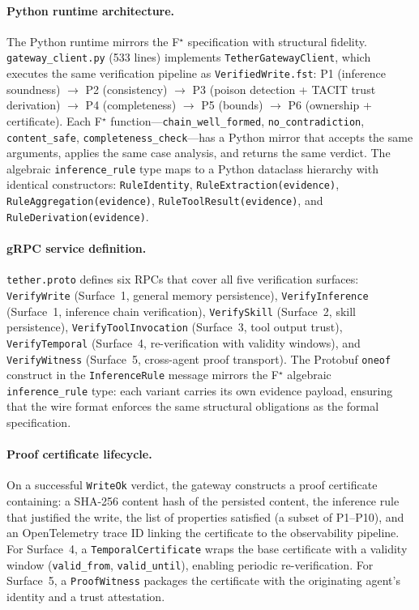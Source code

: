 \documentclass[sigplan,screen,nonacm]{acmart}
\newcommand{\fstar}{F\ensuremath{^\star}}
\begin{document}
\paragraph{Python runtime architecture.}
The Python runtime mirrors the \fstar{} specification with structural
fidelity. \texttt{gateway\_client.py} (533 lines) implements
\texttt{TetherGatewayClient}, which executes the same verification pipeline
as \texttt{VerifiedWrite.fst}: P1 (inference soundness) $\to$ P2
(consistency) $\to$ P3 (poison detection + TACIT trust derivation) $\to$
P4 (completeness) $\to$ P5 (bounds) $\to$ P6 (ownership + certificate).
Each \fstar{} function---\texttt{chain\_well\_formed},
\texttt{no\_contradiction}, \texttt{content\_safe},
\texttt{completeness\_check}---has a Python mirror that accepts the same
arguments, applies the same case analysis, and returns the same verdict. The
algebraic \texttt{inference\_rule} type maps to a Python dataclass hierarchy
with identical constructors: \texttt{RuleIdentity},
\texttt{RuleExtraction(evidence)}, \texttt{RuleAggregation(evidence)},
\texttt{RuleToolResult(evidence)}, and \texttt{RuleDerivation(evidence)}.

\paragraph{gRPC service definition.}
\texttt{tether.proto} defines six RPCs that cover all five verification
surfaces: \texttt{VerifyWrite} (Surface~1, general memory persistence),
\texttt{VerifyInference} (Surface~1, inference chain verification),
\texttt{VerifySkill} (Surface~2, skill persistence),
\texttt{VerifyToolInvocation} (Surface~3, tool output trust),
\texttt{VerifyTemporal} (Surface~4, re-verification with validity windows),
and \texttt{VerifyWitness} (Surface~5, cross-agent proof transport). The
Protobuf \texttt{oneof} construct in the \texttt{InferenceRule} message
mirrors the \fstar{} algebraic \texttt{inference\_rule} type: each variant
carries its own evidence payload, ensuring that the wire format enforces the
same structural obligations as the formal specification.

\paragraph{Proof certificate lifecycle.}
On a successful \texttt{WriteOk} verdict, the gateway constructs a proof
certificate containing: a SHA-256 content hash of the persisted content, the
inference rule that justified the write, the list of properties satisfied (a
subset of P1--P10), and an OpenTelemetry trace ID linking the certificate to
the observability pipeline. For Surface~4, a \texttt{TemporalCertificate}
wraps the base certificate with a validity window (\texttt{valid\_from},
\texttt{valid\_until}), enabling periodic re-verification. For Surface~5, a
\texttt{ProofWitness} packages the certificate with the originating agent's
identity and a trust attestation.
\end{document}
